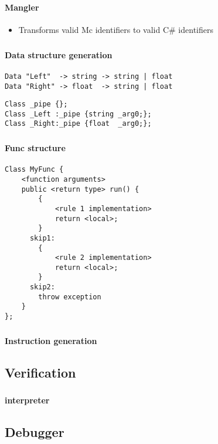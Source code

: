 \begin{frame}
    \frametitle{\subsecname}
    \framesubtitle{Mangler}
    \begin{itemize}
        \item Transforms valid Mc identifiers to valid C\# identifiers
    \end{itemize}
\end{frame}

\begin{frame}[fragile]
    \frametitle{\subsecname}
    \framesubtitle{Data structure generation}
    \begin{lstlisting}
Data "Left"  -> string -> string | float
Data "Right" -> float  -> string | float
    \end{lstlisting}
    
    \begin{lstlisting}
Class _pipe {};
Class _Left :_pipe {string _arg0;};
Class _Right:_pipe {float  _arg0;};
    \end{lstlisting}
\end{frame}

\begin{frame}[fragile]
    \frametitle{\subsecname}
    \framesubtitle{Func structure}
    \begin{lstlisting}
Class MyFunc {
    <function arguments>
    public <return type> run() {
        {
            <rule 1 implementation>
            return <local>;
        }
      skip1:
        {
            <rule 2 implementation>
            return <local>;
        }
      skip2:
        throw exception
    }
};
    \end{lstlisting}
\end{frame}

\begin{frame}
    \frametitle{\subsecname}
    \framesubtitle{Instruction generation}
\end{frame}

\subsection{Verification}
\begin{frame}
    \frametitle{\subsecname}
    \framesubtitle{interpreter}
\end{frame}

\subsection{Debugger}

